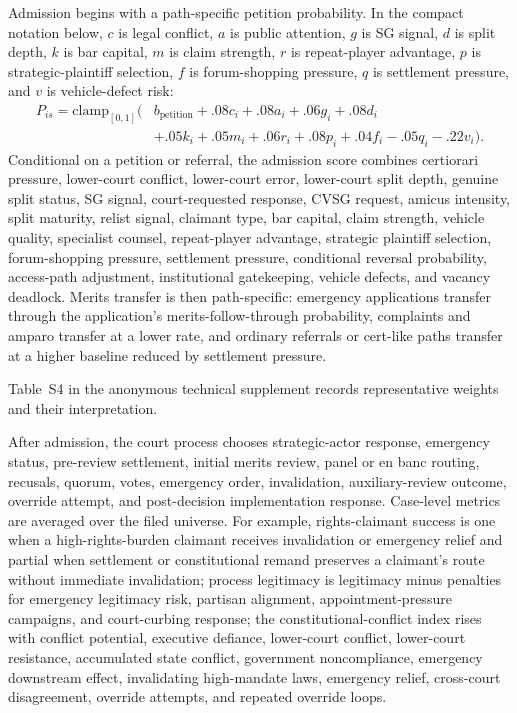 \documentclass[
    journal=jlc,
    manuscript=research-article,
    year=2026,
  ]{cup-journal}
\begin{document}
Admission begins with a path-specific petition probability. In the compact notation below, $c$ is legal conflict, $a$ is public attention, $g$ is SG signal, $d$ is split depth, $k$ is bar capital, $m$ is claim strength, $r$ is repeat-player advantage, $p$ is strategic-plaintiff selection, $f$ is forum-shopping pressure, $q$ is settlement pressure, and $v$ is vehicle-defect risk:
\[
\begin{aligned}
P_{is}=\mathrm{clamp}_{[0,1]}(&b_{\mathrm{petition}}
 + .08c_i + .08a_i + .06g_i + .08d_i \\
&+ .05k_i + .05m_i + .06r_i + .08p_i + .04f_i - .05q_i - .22v_i).
\end{aligned}
\]
Conditional on a petition or referral, the admission score combines certiorari pressure, lower-court conflict, lower-court error, lower-court split depth, genuine split status, SG signal, court-requested response, CVSG request, amicus intensity, split maturity, relist signal, claimant type, bar capital, claim strength, vehicle quality, specialist counsel, repeat-player advantage, strategic plaintiff selection, forum-shopping pressure, settlement pressure, conditional reversal probability, access-path adjustment, institutional gatekeeping, vehicle defects, and vacancy deadlock. Merits transfer is then path-specific: emergency applications transfer through the application's merits-follow-through probability, complaints and amparo transfer at a lower rate, and ordinary referrals or cert-like paths transfer at a higher baseline reduced by settlement pressure.

Table~S4 in the anonymous technical supplement records representative weights and their interpretation.

After admission, the court process chooses strategic-actor response, emergency status, pre-review settlement, initial merits review, panel or en banc routing, recusals, quorum, votes, emergency order, invalidation, auxiliary-review outcome, override attempt, and post-decision implementation response. Case-level metrics are averaged over the filed universe. For example, rights-claimant success is one when a high-rights-burden claimant receives invalidation or emergency relief and partial when settlement or constitutional remand preserves a claimant's route without immediate invalidation; process legitimacy is legitimacy minus penalties for emergency legitimacy risk, partisan alignment, appointment-pressure campaigns, and court-curbing response; the constitutional-conflict index rises with conflict potential, executive defiance, lower-court conflict, lower-court resistance, accumulated state conflict, government noncompliance, emergency downstream effect, invalidating high-mandate laws, emergency relief, cross-court disagreement, override attempts, and repeated override loops.
\end{document}
